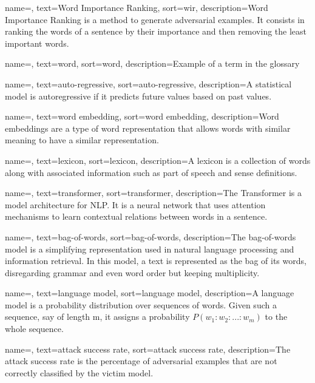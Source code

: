 {
    name=,
    text=Word Importance Ranking,
    sort=wir,
    description={Word Importance Ranking is a method to generate adversarial examples. It consists in ranking the words of a sentence by their importance and then removing the least important words.}
}





{
    name=,
    text=word,
    sort=word,
    description={Example of a term in the glossary}
}

{
    name=,
    text=auto-regressive,
    sort=auto-regressive,
    description={A statistical  model is autoregressive if it predicts future values based on past values.}
}

{
    name=,
    text=word embedding,
    sort=word embedding,
    description={Word embeddings are a type of word representation that allows words with similar meaning to have a similar representation.}
}

{
    name=,
    text=lexicon,
    sort=lexicon,
    description={A lexicon is a collection of words along with associated information such as part of speech and sense definitions.}
}


{
    name=,
    text=transformer,
    sort=transformer,
    description={The Transformer is a model architecture for NLP. It is a neural network that uses attention mechanisms to learn contextual relations between words in a sentence.}
}

{
    name=,
    text=bag-of-words,
    sort=bag-of-words,
    description={The bag-of-words model is a simplifying representation used in natural language processing and information retrieval. In this model, a text is represented as the bag of its words, disregarding grammar and even word order but keeping multiplicity.}
}

{
    name=,
    text=language model,
    sort=language model,
    description={A language model is a probability distribution over sequences of words. Given such a sequence, say of length m, it assigns a probability $P(w_1:w_2:...:w_m)$ to the whole sequence.}
}

{
    name=,
    text=attack success rate,
    sort=attack success rate,
    description={The attack success rate is the percentage of adversarial examples that are not correctly classified by the victim model.}
}




